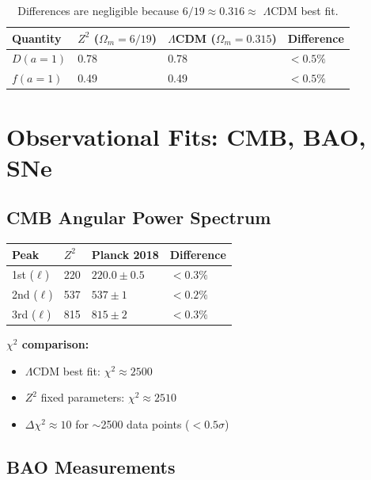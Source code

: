 \documentclass[11pt,a4paper]{article}
\theoremstyle{plain}
\theoremstyle{definition}
\theoremstyle{remark}
\newcommand{\Omegam}{\Omega_m}
\begin{document}
\begin{table}[h!]
\centering
\begin{tabular}{llll}
\toprule
\textbf{Quantity} & \textbf{$Z^2$ ($\Omegam = 6/19$)} & \textbf{$\Lambda$CDM ($\Omegam = 0.315$)} & \textbf{Difference} \\
\midrule
$D(a=1)$ & 0.78 & 0.78 & $< 0.5\%$ \\
$f(a=1)$ & 0.49 & 0.49 & $< 0.5\%$ \\
\bottomrule
\end{tabular}
\caption{Differences are negligible because $6/19 \approx 0.316 \approx$ $\Lambda$CDM best fit.}
\end{table}

\section{Observational Fits: CMB, BAO, SNe}

\subsection{CMB Angular Power Spectrum}

\begin{table}[h!]
\centering
\begin{tabular}{llll}
\toprule
\textbf{Peak} & \textbf{$Z^2$} & \textbf{Planck 2018} & \textbf{Difference} \\
\midrule
1st ($\ell$) & 220 & $220.0 \pm 0.5$ & $< 0.3\%$ \\
2nd ($\ell$) & 537 & $537 \pm 1$ & $< 0.2\%$ \\
3rd ($\ell$) & 815 & $815 \pm 2$ & $< 0.3\%$ \\
\bottomrule
\end{tabular}
\end{table}

\textbf{$\chi^2$ comparison:}
\begin{itemize}
  \item $\Lambda$CDM best fit: $\chi^2 \approx 2500$
  \item $Z^2$ fixed parameters: $\chi^2 \approx 2510$
  \item $\Delta\chi^2 \approx 10$ for $\sim$2500 data points ($< 0.5\sigma$)
\end{itemize}

\subsection{BAO Measurements}
\end{document}
